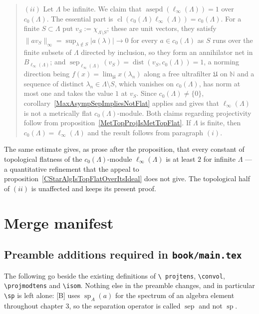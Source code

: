 \documentclass[11pt]{article}
\theoremstyle{plain}
\theoremstyle{definition}
\DeclareMathOperator{\dist}{dist}
\DeclareMathOperator{\sep}{sep}
\DeclareMathOperator{\asepd}{asepd}
\begin{document}
\begin{quote}
$(ii)$ Let $\Lambda$ be infinite. We claim that
$\asepd(\ell_\infty(\Lambda))=1$ over $c_0(\Lambda)$. The essential part is
$\operatorname{cl}(c_0(\Lambda)\ell_\infty(\Lambda))=c_0(\Lambda)$. For a finite
$S\subset\Lambda$ put $v_S:=\chi_{\Lambda\setminus S}$; these are unit vectors,
they satisfy $\lVert av_S\rVert_\infty=\sup_{\lambda\notin S}|a(\lambda)|\to 0$
for every $a\in c_0(\Lambda)$ as $S$ runs over the finite subsets of $\Lambda$
directed by inclusion, so they form an annihilator net in
$B_{\ell_\infty(\Lambda)}$; and
$\sep_{\ell_\infty(\Lambda)}(v_S)=\dist(v_S,c_0(\Lambda))=1$, a norming direction
being $f(x)=\lim_{\mathfrak{U}}x(\lambda_n)$ along a free ultrafilter
$\mathfrak{U}$ on $\mathbb{N}$ and a sequence of distinct
$\lambda_n\in\Lambda\setminus S$, which vanishes on $c_0(\Lambda)$, has norm at
most one and takes the value $1$ at $v_S$. Since $c_0(\Lambda)\neq \{0 \}$,
corollary~\ref{MaxAsympSepImpliesNotFlat} applies and gives that
$\ell_\infty(\Lambda)$ is not a metrically flat $c_0(\Lambda)$-module. Both
claims regarding projectivity follow from
proposition~\ref{MetTopProjIsMetTopFlat}. If $\Lambda$ is finite, then
$c_0(\Lambda)=\ell_\infty(\Lambda)$ and the result follows from paragraph $(i)$.
\end{quote}

The same estimate gives, as prose after the proposition, that every constant of
topological flatness of the $c_0(\Lambda)$-module $\ell_\infty(\Lambda)$ is at
least $2$ for infinite $\Lambda$ --- a quantitative refinement that the appeal to
proposition~\ref{CStarAlgIsTopFlatOverItsIdeal} does not give. The topological
half of $(ii)$ is unaffected and keeps its present proof.

\section{Merge manifest}\label{PartIV}

\subsection{Preamble additions required in \texttt{book/main.tex}}

The following go beside the existing definitions of \texttt{\textbackslash
projtens}, \texttt{\textbackslash convol}, \texttt{\textbackslash projmodtens}
and \texttt{\textbackslash isom}. Nothing else in the preamble changes, and in
particular \texttt{\textbackslash sp} is left alone: [B] uses
$\operatorname{sp}_A(a)$ for the spectrum of an algebra element throughout
chapter 3, so the separation operator is called $\sep$ and not $\operatorname{sp}$.
\end{document}
